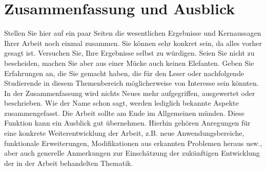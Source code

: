 
\chapter{Zusammenfassung und Ausblick} \label{sec:ausblick}

Stellen Sie hier auf ein paar Seiten die wesentlichen Ergebnisse und Kernaussagen Ihrer Arbeit noch einmal zusammen. Sie können sehr konkret sein, da alles vorher gesagt ist. Versuchen Sie, Ihre Ergebnisse selbst zu würdigen. Seien Sie nicht zu bescheiden, machen Sie aber aus einer Mücke auch keinen Elefanten. Geben Sie Erfahrungen an, die Sie gemacht haben, die für den Leser oder nachfolgende Studierende in diesem Themenbereich möglicherweise von Interesse sein könnten. In der Zusammenfassung wird nichts Neues mehr aufgegriffen, ausgewertet oder beschrieben. Wie der Name schon sagt, werden lediglich bekannte Aspekte zusammengefasst.
Die Arbeit sollte am Ende im Allgemeinen münden. Diese Funktion kann ein Ausblick gut übernehmen. Hierhin gehören Anregungen für eine konkrete Weiterentwicklung der Arbeit, z.B. neue Anwendungsbereiche, funktionale Erweiterungen, Modifikationen aus erkannten Problemen heraus usw., aber auch generelle Anmerkungen zur Einschätzung der zukünftigen Entwicklung der in der Arbeit behandelten Thematik.

